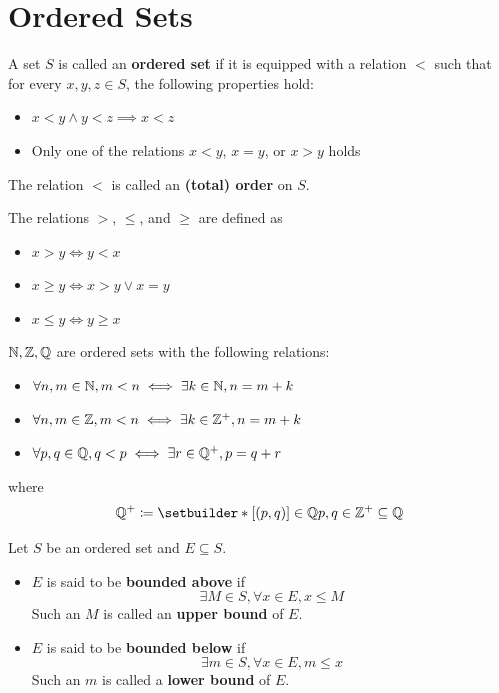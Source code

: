 \section{Ordered Sets}

A set $S$ is called an \textbf{ordered set} if it is equipped with a relation $<$
such that for every $x, y, z \in S$, the following properties hold:
\begin{itemize}
    \item $x < y \land y < z \implies x < z$
    \item Only one of the relations $x < y$, $x = y$, or $x > y$ holds
\end{itemize}
The relation $<$ is called an \textbf{(total) order} on $S$.

\bigskip

\begin{definition} \label{an:def:order-relations}
    The relations $>$, $\leq$, and $\geq$ are defined as
    \begin{itemize}
        \item $x > y \iff y < x$
        \item $x \geq y \iff x > y \lor x = y$
        \item $x \leq y \iff y \geq x$
    \end{itemize}
\end{definition}

\bigskip

\begin{example}
    $\mathbb{N}, \mathbb{Z}, \mathbb{Q}$ are ordered sets with the following relations:
    \begin{itemize}
        \item $\forall n, m \in \mathbb{N}, m < n \iff \exists k \in \mathbb{N}, n = m + k$
        \item $\forall n, m \in \mathbb{Z}, m < n \iff \exists k \in \mathbb{Z}^{+}, n = m + k$
        \item $\forall p, q \in \mathbb{Q}, q < p \iff \exists r \in \mathbb{Q}^{+}, p = q + r$
    \end{itemize}
    where
    \[
    \Q^{+} \coloneqq \setbuilder*{[(p, q)] \in \Q}{p, q \in \Z^{+}} \subseteq \Q
    \]
\end{example}

\bigskip

\begin{definition} \label{an:def:boundedness}
    Let $S$ be an ordered set and $E \subseteq S$.
    \begin{itemize}
        \item $E$ is said to be \textbf{bounded above} if
        \[
        \exists M \in S, \forall x \in E, x \leq M
        \]
        Such an $M$ is called an \textbf{upper bound} of $E$.
        \item $E$ is said to be \textbf{bounded below} if
        \[
        \exists m \in S, \forall x \in E, m \leq x
        \]
        Such an $m$ is called a \textbf{lower bound} of $E$.
    \end{itemize}
\end{definition}

